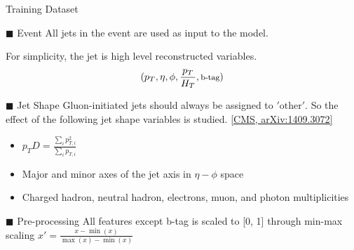 \documentclass[10pt]{beamer}
\begin{document}

\begin{frame}[fragile]{Training Dataset}
    \begin{block}{$\blacksquare$ Event}
        \smallskip
        All jets in the event are used as input to the model.
        
        For simplicity, the jet is high level reconstructed variables.
        $$\footnotesize (p_{T}, \eta, \phi, \frac{p_{T}}{H_{T}}, \text{b-tag})$$
    \end{block}
    \begin{block}{$\blacksquare$ Jet Shape}
        Gluon-initiated jets should always be assigned to $'\text{other}'$. So the effect of the following jet shape variables is studied.
        \href{https://arxiv.org/abs/1409.3072}{[CMS, arXiv:1409.3072]}
        \begin{itemize}
            \item {\footnotesize $p_{T}D=\frac{ \sum_{i} p_{T,i}^{2} }{ \sum_{i} p_{T,i} }$}
            \item {\footnotesize Major and minor axes of the jet axis in $\eta-\phi$ space}
            \item {\footnotesize Charged hadron, neutral hadron, electrons, muon, and photon multiplicities}
        \end{itemize}
    \end{block}
    \begin{block}{$\blacksquare$ Pre-processing}
        {\footnotesize All features except b-tag is scaled to [0, 1] through min-max scaling $x'=\frac{x-\min({x})}{\max({x})-\min({x})}$}
    \end{block}
    
\end{frame}







\end{document}
